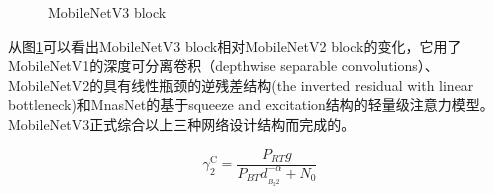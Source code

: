 \documentclass[UTF8,a4paper,12pt]{ctexart}
\begin{document}
 \begin{figure}[htbp]
	\centering
	\quad
	\caption{MobileNetV3 block}
	\label{fig-MobileNetV3 block}
\end{figure}

从图\ref{fig-MobileNetV3 block}可以看出MobileNetV3 block相对MobileNetV2 block的变化，它用了MobileNetV1\cite{2017MobileNets}的深度可分离卷积（depthwise separable convolutions）、MobileNetV2\cite{MOBV2}的具有线性瓶颈的逆残差结构(the inverted residual with linear bottleneck)和MnasNet\cite{MnasNet}的基于squeeze and excitation结构的轻量级注意力模型。MobileNetV3正式综合以上三种网络设计结构而完成的。







\begin{equation}\label{eq}
  \gamma _2^{\text{C}} = \frac{{{P_{RT}}g}}{{{P_{BT}}d_{_{{B_2}2}}^{ - \alpha } + {N_0}}}
\end{equation}
 
 
\end{document}
